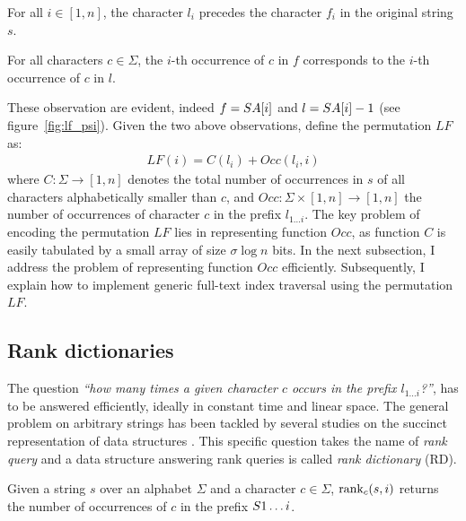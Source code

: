 \begin{observation}
\label{obs:lf-a}
\citep{Burrows1994}
For all $i \in [1,n]$, the character $l_i$ precedes the character $f_i$ in the original string $s$.%
\end{observation}
\begin{observation}
\label{obs:lf-b}
\citep{Burrows1994}
For all characters $c \in \Sigma$, the $i$-th occurrence of $c$ in $f$ corresponds to the $i$-th occurrence of $c$ in $l$.
\end{observation}

These observation are evident, indeed $f = S{A[i]}$ and $l = S{A[i] - 1}$ (see figure~\ref{fig:lf_psi}).
Given the two above observations, \cite{Ferragina2000} define the permutation $LF$ as:
\begin{eqnarray}
LF(i) = C(l_i) + Occ(l_i, i)
\end{eqnarray}
where $C : \Sigma \rightarrow [1,n]$ denotes the total number of occurrences in $s$ of all characters alphabetically smaller than $c$, and $Occ :  \Sigma \times [1,n] \rightarrow [1,n]$ the number of occurrences of character $c$ in the prefix $l_{1 \dots i}$.
The key problem of encoding the permutation $LF$ lies in representing function $Occ$, as function $C$ is easily tabulated by a small array of size $\sigma \log{n}$ bits.
In the next subsection, I address the problem of representing function $Occ$ efficiently. Subsequently, I explain how to implement generic full-text index traversal using the permutation $LF$.

\subsection{Rank dictionaries}
\label{sec:index:succinct:rd}

The question \emph{``how many times a given character $c$ occurs in the prefix $l_{1 \dots i}$?''}, has to be answered efficiently, ideally in constant time and linear space.
The general problem on arbitrary strings has been tackled by several studies on the succinct representation of data structures \citep{Jacobson1989}.
This specific question takes the name of \emph{rank query} and a data structure answering rank queries is called \emph{rank dictionary} (RD).

\begin{definition}
Given a string $s$ over an alphabet $\Sigma$ and a character $c \in \Sigma$, $\text{rank}_c(s, i)$ returns the number of occurrences of $c$ in the prefix $S{1 \dots i}$.
\end{definition}

